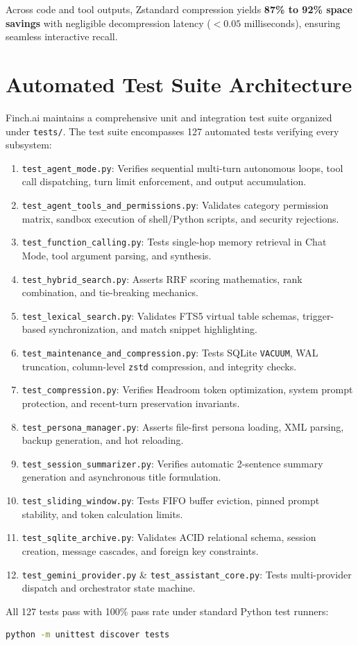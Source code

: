 Across code and tool outputs, Zstandard compression yields \textbf{87\% to 92\% space savings} with negligible decompression latency ($< 0.05$ milliseconds), ensuring seamless interactive recall.

\section{Automated Test Suite Architecture}
Finch.ai maintains a comprehensive unit and integration test suite organized under \texttt{tests/}. The test suite encompasses 127 automated tests verifying every subsystem:

\begin{enumerate}
    \item \texttt{test\_agent\_mode.py}: Verifies sequential multi-turn autonomous loops, tool call dispatching, turn limit enforcement, and output accumulation.
    \item \texttt{test\_agent\_tools\_and\_permissions.py}: Validates category permission matrix, sandbox execution of shell/Python scripts, and security rejections.
    \item \texttt{test\_function\_calling.py}: Tests single-hop memory retrieval in Chat Mode, tool argument parsing, and synthesis.
    \item \texttt{test\_hybrid\_search.py}: Asserts RRF scoring mathematics, rank combination, and tie-breaking mechanics.
    \item \texttt{test\_lexical\_search.py}: Validates FTS5 virtual table schemas, trigger-based synchronization, and match snippet highlighting.
    \item \texttt{test\_maintenance\_and\_compression.py}: Tests SQLite \texttt{VACUUM}, WAL truncation, column-level \texttt{zstd} compression, and integrity checks.
    \item \texttt{test\_compression.py}: Verifies Headroom token optimization, system prompt protection, and recent-turn preservation invariants.
    \item \texttt{test\_persona\_manager.py}: Asserts file-first persona loading, XML parsing, backup generation, and hot reloading.
    \item \texttt{test\_session\_summarizer.py}: Verifies automatic 2-sentence summary generation and asynchronous title formulation.
    \item \texttt{test\_sliding\_window.py}: Tests FIFO buffer eviction, pinned prompt stability, and token calculation limits.
    \item \texttt{test\_sqlite\_archive.py}: Validates ACID relational schema, session creation, message cascades, and foreign key constraints.
    \item \texttt{test\_gemini\_provider.py} \& \texttt{test\_assistant\_core.py}: Tests multi-provider dispatch and orchestrator state machine.
\end{enumerate}

All 127 tests pass with 100\% pass rate under standard Python test runners:
\begin{lstlisting}[language=bash]
python -m unittest discover tests
\end{lstlisting}
